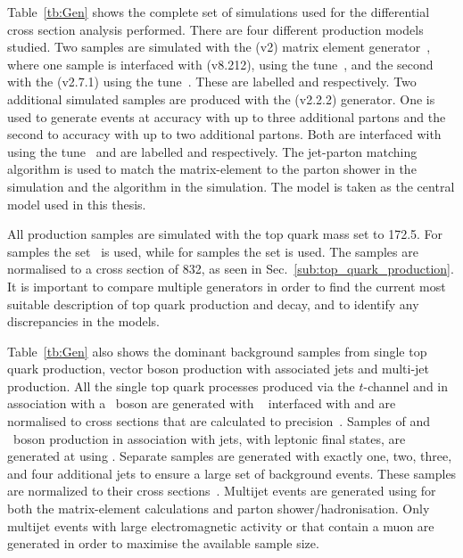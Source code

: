 Table~\ref{tb:Gen} shows the complete set of simulations used for the differential cross section analysis performed.
There are four different \ttbar{} production models studied.
Two \ttbar{} samples are simulated with the \powheg{} (v2) matrix element generator~\cite{Gen:PowHVF}, where one sample is interfaced with \pythia{} (v8.212), using the \CUET{} tune~\cite{Gen:CUETP8M2T4}, and the second with the \herwig{} (v2.7.1) using the \herwigtune{} tune~\cite{Gen:EE5C}.
These are labelled \powhegpythia{} and \powhegherwig{} respectively.
Two additional simulated \ttbar samples are produced with the \mgamc{} (v2.2.2) generator.
One is used to generate events at \LO{} accuracy with up to three additional partons and the second to \NLO{} accuracy with up to two additional partons.
Both are interfaced with \pythia{} using the \CUETold{} tune~\cite{Gen:CUETP8M1} and are labelled \mgamcLO{} and \mgamcNLO{} respectively.
The \MLM{} jet-parton matching algorithm is used to match the matrix-element to the parton shower in the \LO{} simulation and the \FxFx{} algorithm in the \NLO{} simulation.
The \powhegpythia{} model is taken as the central model used in this thesis.

All \ttbar{} production samples are simulated with the top quark mass set to 172.5\GeV{}.
For \NLO{} samples the \nnpdf{} \PDF{} set~\cite{Gen:NNPDF} is used, while for \LO{} samples the \nnpdflo{} set is used.
The samples are normalised to a \NNLO{} \ttbar{} cross section of 832\pb{}, as seen in Sec.~\ref{sub:top_quark_production}.
It is important to compare multiple \ttbar{} generators in order to find the current most suitable description of top quark production and decay, and to identify any discrepancies in the models.

Table~\ref{tb:Gen} also shows the dominant background samples from single top quark production, vector boson production with associated jets and multi-jet \QCD{} production.
All the single top quark processes produced via the $t$-channel and in association with a \Wboson{}~boson are generated with \powheg{}~\cite{Gen:Pow_tchan,Gen:Pow_tWchan} interfaced with \pythia and are normalised to cross sections that are calculated to \NLO{} precision~\cite{Gen:ST_XSECPred_1,Gen:ST_XSECPred_2}.  
Samples of \Wboson{}{} and \Zboson{}~boson production in association with jets, with leptonic final states, are generated at \LO{} using \mgamc{}. 
Separate samples are generated with exactly one, two, three, and four additional jets to ensure a large set of background events.
These samples are normalized to their \NNLO{} cross sections~\cite{Gen:VJets_XSECPred}.
Multijet \QCD{} events are generated using \pythia{} for both the matrix-element calculations and parton shower/hadronisation.
Only multijet \QCD{} events with large electromagnetic activity or that contain a muon are generated in order to maximise the available sample size.

